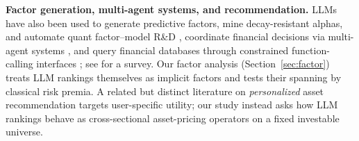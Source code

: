 \textbf{Factor generation, multi-agent systems, and recommendation.}
LLMs have also been used to generate predictive factors, mine decay-resistant alphas, and automate quant factor--model R\&D \citep{cheng2024chatgptfactor,tang2025alphaagent,li2025rdagent}, coordinate financial decisions via multi-agent systems \citep{lyu2025alphaagents,cheng2024aapm,yang2024finrobot}, and query financial databases through constrained function-calling interfaces \citep{kim2025finaidata}; see \citet{nie2024surveylargelanguagemodels} for a survey.
Our factor analysis (Section~\ref{sec:factor}) treats LLM rankings themselves as implicit factors and tests their spanning by classical risk premia.
A related but distinct literature on \emph{personalized} asset recommendation \citep{chung2025mvecf,lee2024pfotgnrec,sanzcruzado2024fartrans,sakurai2026rura} targets user-specific utility; our study instead asks how LLM rankings behave as cross-sectional asset-pricing operators on a fixed investable universe.

